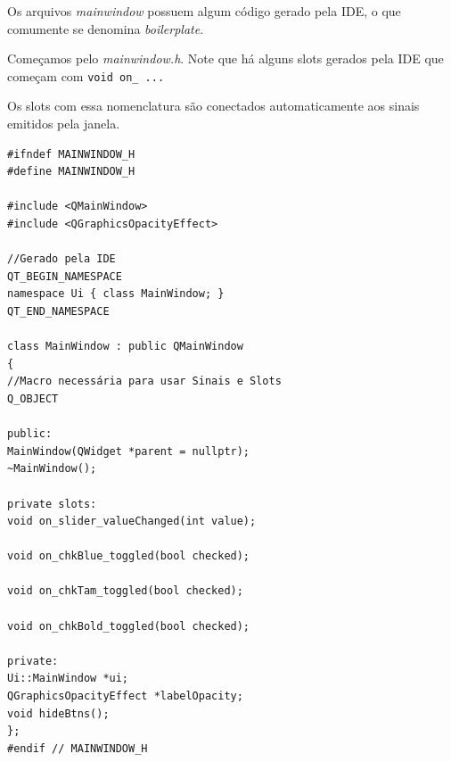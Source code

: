 \documentclass[12pt,a4paper]{article}
\begin{document}
Os arquivos \emph{mainwindow} possuem algum código gerado pela IDE, o que comumente se denomina \emph{boilerplate}.

Começamos pelo \emph{mainwindow.h}. Note que há alguns slots gerados pela IDE que começam com \texttt{void on\_ ...} 

Os slots com essa nomenclatura são conectados automaticamente aos sinais emitidos pela janela. 
\begin{verbatim}
#ifndef MAINWINDOW_H
#define MAINWINDOW_H

#include <QMainWindow>
#include <QGraphicsOpacityEffect>

//Gerado pela IDE
QT_BEGIN_NAMESPACE
namespace Ui { class MainWindow; }
QT_END_NAMESPACE

class MainWindow : public QMainWindow
{
//Macro necessária para usar Sinais e Slots
Q_OBJECT

public:
MainWindow(QWidget *parent = nullptr);
~MainWindow();

private slots:
void on_slider_valueChanged(int value);

void on_chkBlue_toggled(bool checked);

void on_chkTam_toggled(bool checked);

void on_chkBold_toggled(bool checked);

private:
Ui::MainWindow *ui;
QGraphicsOpacityEffect *labelOpacity;
void hideBtns();
};
#endif // MAINWINDOW_H
\end{verbatim}
\end{document}
